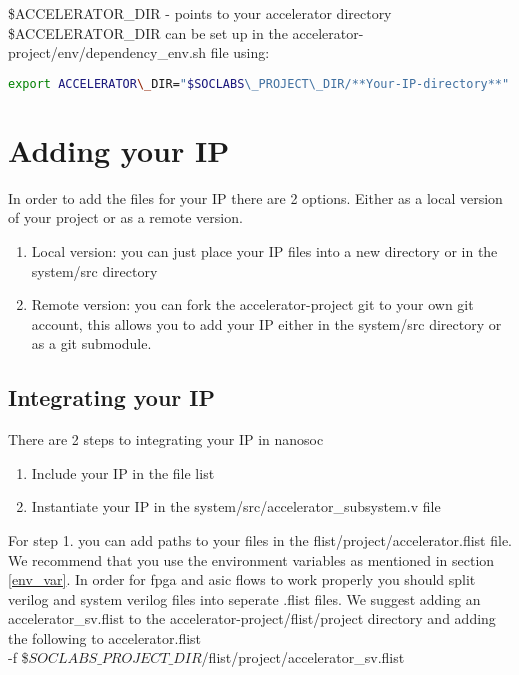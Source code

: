 \documentclass{report}
\begin{document}
\$ACCELERATOR\_DIR - points to your accelerator directory \\


\$ACCELERATOR\_DIR can be set up in the accelerator-project/env/dependency\_env.sh file using:

\begin{lstlisting}[language=bash]
export ACCELERATOR\_DIR="$SOCLABS\_PROJECT\_DIR/**Your-IP-directory**"
\end{lstlisting}

\chapter{Adding your IP}
In order to add the files for your IP there are 2 options. Either as a local version of your project or
as a remote version.

\begin{enumerate}
    \item Local version: you can just place your IP files into a new directory or in the system/src directory
    \item Remote version: you can fork the accelerator-project git to your own git account, this allows you to add your IP either in the system/src directory or as a git submodule.
\end{enumerate}

\section{Integrating your IP}
There are 2 steps to integrating your IP in nanosoc 
\begin{enumerate}
    \item Include your IP in the file list
    \item Instantiate your IP in the system/src/accelerator\_subsystem.v file
\end{enumerate}

For step 1. you can add paths to your files in the flist/project/accelerator.flist file. We recommend that you use the environment variables as mentioned
in section \ref{env_var}. In order for fpga and asic flows to work properly you should split verilog and system verilog files into seperate .flist files.
We suggest adding an accelerator\_sv.flist to the accelerator-project/flist/project directory and adding the following to accelerator.flist \\

-f \$\(SOCLABS\_PROJECT\_DIR\)/flist/project/accelerator\_sv.flist \\
\end{document}
